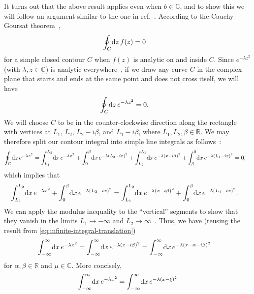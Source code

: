 It turns out that the above result applies even when $b \in \mathbb{C}$, and to show this we will follow an argument similar to the one in ref.~\cite[132-135]{kwok2002applied}.
According to the Cauchy--Goursat theorem~\cite[128]{kwok2002applied},
\begin{align}
	\oint_C\! \dif z \, f(z)
	&= 0
\end{align}
for a simple closed contour $C$ when $f(z)$ is analytic on and inside $C$.
Since $e^{-\lambda z^2}$ (with $\lambda, z \in \mathbb{C}$) is analytic everywhere~\cite[61]{kwok2002applied}, if we draw any curve $C$ in the complex plane that starts and ends at the same point and does not cross itself, we will have
\begin{align}
	\oint_C\! \dif z \, e^{-\lambda z^2}
	&= 0.
\end{align}
We will choose $C$ to be in the counter-clockwise direction along the rectangle with vertices at $L_1$, $L_2$, $L_2 - i \beta$, and $L_1 - i \beta$, where $L_1, L_2, \beta \in \mathbb{R}$.
We may therefore split our contour integral into simple line integrals as follows~\cite[122]{kwok2002applied}:
\begin{align}
	\oint_C\! \dif z \, e^{-\lambda z^2}
	&= \int_{L_1}^{L_2}\! \dif x \, e^{-\lambda x^2}
		+ \int_0^\beta\! \dif x \, e^{-\lambda (L_2 - i x)^2}
		+ \int_{L_2}^{L_1}\! \dif x \, e^{-\lambda (x - i \beta)^2}
		+ \int_\beta^0\! \dif x \, e^{-\lambda (L_1 - i x)^2}
	= 0,
\end{align}
which implies that
\begin{align}
	\int_{L_1}^{L_2}\! \dif x \, e^{-\lambda x^2}
		+ \int_0^\beta\! \dif x \, e^{-\lambda (L_2 - i x)^2}
	&= \int_{L_1}^{L_2}\! \dif x \, e^{-\lambda (x - i \beta)^2}
		+ \int_0^\beta\! \dif x \, e^{-\lambda (L_1 - i x)^2}.
\end{align}
We can apply the modulus inequality to the ``vertical'' segments to show that they vanish in the limits $L_1 \to -\infty$ and $L_2 \to \infty$~\cite[134]{kwok2002applied}.
Thus, we have (reusing the result from \cref{eq:infinite-integral-translation})
\begin{align}
	\int_{-\infty}^\infty\! \dif x \, e^{-\lambda x^2}
	&= \int_{-\infty}^\infty\! \dif x \, e^{-\lambda (x - i \beta)^2}
	= \int_{-\infty}^\infty\! \dif x \, e^{-\lambda (x - \alpha - i \beta)^2}
\end{align}
for $\alpha, \beta \in \mathbb{R}$ and $\mu \in \mathbb{C}$.
More concisely,
\begin{align}
	\int_{-\infty}^\infty\! \dif x \, e^{-\lambda x^2}
	= \int_{-\infty}^\infty\! \dif x \, e^{-\lambda (x - \xi)^2}
\end{align}
